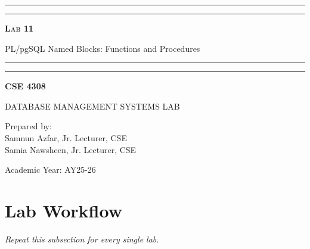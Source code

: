 \documentclass[12pt,a4paper]{article}
\newcommand{\labNo}{Lab 11}
\newcommand{\labTopic}{PL/pgSQL Named Blocks: Functions and Procedures}
\newcommand{\courseCode}{CSE 4308}
\newcommand{\courseTitleLong}{DATABASE MANAGEMENT SYSTEMS LAB}
\newcommand{\instructorName}{Samnun Azfar, Jr. Lecturer, CSE\\ Samia Nawsheen, Jr. Lecturer, CSE}
\newcommand{\academicYear}{AY25-26}
\begin{document}
\begin{titlepage}
    \centering
    \vspace*{2\baselineskip}

    \rule{14cm}{2pt}\vspace*{-0.8\baselineskip}\vspace*{1.5pt}
    \rule{14cm}{0.5pt}\vspace{2\baselineskip}

    {\Huge\bfseries\scshape \labNo\par} %
    \vspace{3mm}
    {\Large \labTopic} %
    \vspace{3mm}

    \rule{14cm}{0.5pt}\vspace*{-0.7\baselineskip}\vspace{2.5pt}
    \rule{14cm}{2pt}

    \vspace{2\baselineskip}

    {\Large\bfseries \courseCode\par} %
    \vspace{1\baselineskip}
    {\large \courseTitleLong\par} %

    \vfill
    {\normalsize Prepared by:\\ \instructorName\par} %
    {\normalsize Academic Year: \academicYear\par} %
\end{titlepage}

\newpage
\tableofcontents
\newpage

\section{Lab Workflow}



\textit{Repeat this subsection for every single lab.}
\end{document}
